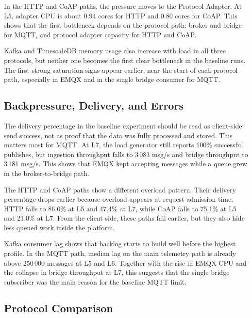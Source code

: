 In the \gls{HTTP} and \gls{CoAP} paths, the pressure moves to the Protocol Adapter. At L5, adapter CPU is about 0.94 cores for \gls{HTTP} and 0.80 cores for \gls{CoAP}. This shows that the first bottleneck depends on the protocol path: broker and bridge for \gls{MQTT}, and protocol adapter capacity for \gls{HTTP} and \gls{CoAP}.

Kafka and TimescaleDB memory usage also increase with load in all three protocols, but neither one becomes the first clear bottleneck in the baseline runs. The first strong saturation signs appear earlier, near the start of each protocol path, especially in EMQX and in the single bridge consumer for \gls{MQTT}.

\subsection{Backpressure, Delivery, and Errors}
\label{subsec:EvalBaselineDelivery}

The delivery percentage in the baseline experiment should be read as client-side send success, not as proof that the data was fully processed and stored. This matters most for \gls{MQTT}. At L7, the load generator still reports 100\% successful publishes, but ingestion throughput falls to 3\,083 msg/s and bridge throughput to 3\,181 msg/s. This shows that EMQX kept accepting messages while a queue grew in the broker-to-bridge path.

The \gls{HTTP} and \gls{CoAP} paths show a different overload pattern. Their delivery percentage drops earlier because overload appears at request admission time. \gls{HTTP} falls to 86.6\% at L5 and 47.4\% at L7, while \gls{CoAP} falls to 75.1\% at L5 and 21.0\% at L7. From the client side, these paths fail earlier, but they also hide less queued work inside the platform.

Kafka consumer lag shows that backlog starts to build well before the highest profile. In the \gls{MQTT} path, median lag on the main telemetry path is already above 250\,000 messages at L5 and L6. Together with the rise in EMQX CPU and the collapse in bridge throughput at L7, this suggests that the single bridge subscriber was the main reason for the baseline \gls{MQTT} limit.

\subsection{Protocol Comparison}
\label{subsec:EvalBaselineProtocol}

